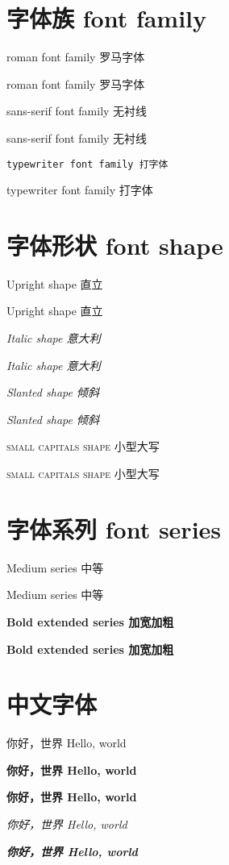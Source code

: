 \documentclass{ctexart}
\begin{document}
  \section*{字体族 font family}

    \textrm{roman font family 罗马字体}%

    {\rmfamily roman font family 罗马字体}%

    \textsf{sans-serif font family 无衬线}

    {\sffamily sans-serif font family 无衬线}

    \texttt{typewriter font family 打字体}

    {\ttfamily typewriter font family 打字体}

  \section*{字体形状 font shape}

    \textup{Upright shape 直立}

    {\upshape Upright shape 直立}

    \textit{Italic shape 意大利}

    {\itshape Italic shape 意大利}

    \textsl{Slanted shape 倾斜}

    {\slshape Slanted shape 倾斜}

    \textsc{small capitals shape 小型大写}

    {\scshape small capitals shape 小型大写}

  \section*{字体系列 font series}

    \textmd{Medium series 中等}

    {\mdseries Medium series 中等}

    \textbf{Bold extended series 加宽加粗}

    {\bfseries Bold extended series 加宽加粗}

  \section*{中文字体}
    
    { 你好，世界 Hello, world}

    \textbf{ 你好，世界 Hello, world}

    \textbf{你好，世界 Hello, world}

    \textit{你好，世界 Hello, world}

    \textbf{\textit{你好，世界 Hello, world}}
\end{document}
